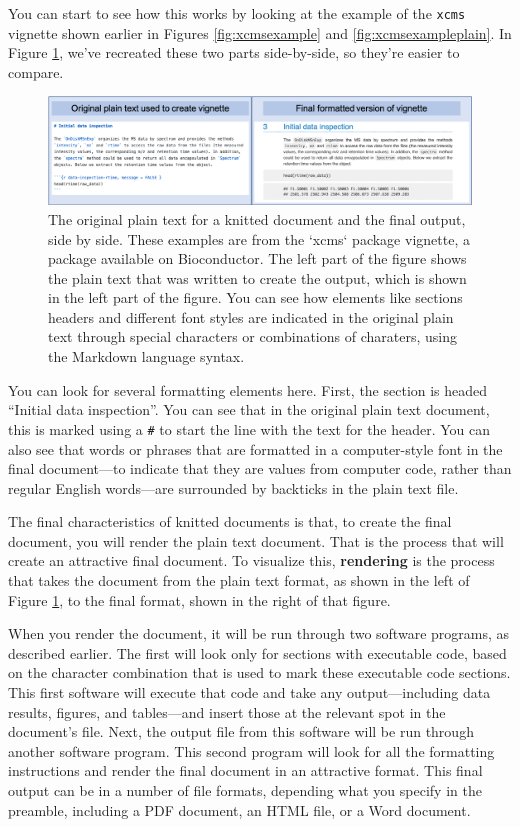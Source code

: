 \documentclass[]{tufte-book}
\begin{document}
You can start to see how this works by looking at the example of the \texttt{xcms}
vignette shown earlier in Figures \ref{fig:xcmsexample} and
\ref{fig:xcmsexampleplain}. In Figure \ref{fig:xcmsbothversions}, we've
recreated these two parts side-by-side, so they're easier to compare.

\begin{figure}
\includegraphics[width=\textwidth]{figures/originalandfinal} \caption[The original plain text for a knitted document and the final output, side by side]{The original plain text for a knitted document and the final output, side by side. These examples are from the `xcms` package vignette, a package available on Bioconductor. The left part of the figure shows the plain text that was written to create the output, which is shown in the left part of the figure. You can see how elements like sections headers and different font styles are indicated in the original plain text through special characters or combinations of charaters, using the Markdown language syntax.}\label{fig:xcmsbothversions}
\end{figure}

You can look for several formatting elements here. First, the section is headed
``Initial data inspection''. You can see that in the original plain text document,
this is marked using a \texttt{\#} to start the line with the text for the header. You
can also see that words or phrases that are formatted in a computer-style font
in the final document---to indicate that they are values from computer code,
rather than regular English words---are surrounded by backticks in the plain
text file.

The final characteristics of knitted documents is that, to create the final
document, you will render the plain text document. That is the process that will
create an attractive final document. To visualize this, \textbf{rendering} is the
process that takes the document from the plain text format, as shown in the left
of Figure \ref{fig:xcmsbothversions}, to the final format, shown in the right
of that figure.

When you render the document, it will be run through two software programs, as
described earlier. The first will look only for sections with executable code,
based on the character combination that is used to mark these executable code
sections. This first software will execute that code and take any
output---including data results, figures, and tables---and insert those at the
relevant spot in the document's file. Next, the output file from this software
will be run through another software program. This second program will look
for all the formatting instructions and render the final document in an
attractive format. This final output can be in a number of file formats,
depending what you specify in the preamble, including a PDF document, an HTML
file, or a Word document.
\end{document}
